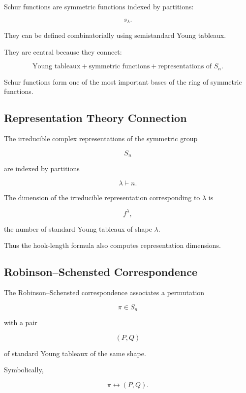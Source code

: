 Schur functions are symmetric functions indexed by partitions:

\[
\boxed{
s_\lambda.
}
\]

They can be defined combinatorially using semistandard Young tableaux.

They are central because they connect:

\[
\boxed{
\text{Young tableaux}
+
\text{symmetric functions}
+
\text{representations of }S_n.
}
\]

Schur functions form one of the most important bases of the ring of
symmetric functions.

\subsection{Representation Theory Connection}
\label{subsec:representation-theory-combinatorics}

The irreducible complex representations of the symmetric group

\[
S_n
\]

are indexed by partitions

\[
\lambda\vdash n.
\]

The dimension of the irreducible representation corresponding to
\(\lambda\) is

\[
\boxed{
f^\lambda,
}
\]

the number of standard Young tableaux of shape \(\lambda\).

Thus the hook-length formula also computes representation dimensions.

\subsection{Robinson--Schensted Correspondence}
\label{subsec:robinson-schensted}

The Robinson--Schensted correspondence associates a permutation

\[
\pi\in S_n
\]

with a pair

\[
(P,Q)
\]

of standard Young tableaux of the same shape.

Symbolically,

\[
\boxed{
\pi
\longleftrightarrow
(P,Q).
}
\]

